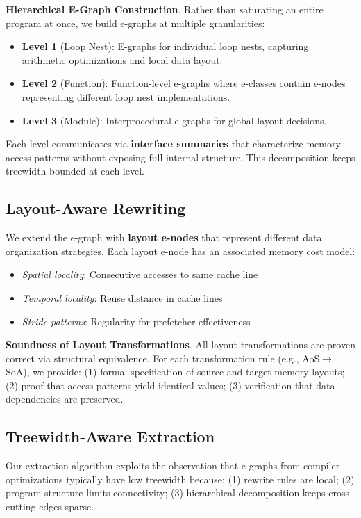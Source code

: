 \documentclass[11pt]{article}
\begin{document}
\textbf{Hierarchical E-Graph Construction}. Rather than saturating an entire program at once, we build e-graphs at multiple granularities:
\begin{itemize}
    \item \textbf{Level 1} (Loop Nest): E-graphs for individual loop nests, capturing arithmetic optimizations and local data layout.
    \item \textbf{Level 2} (Function): Function-level e-graphs where e-classes contain e-nodes representing different loop nest implementations.
    \item \textbf{Level 3} (Module): Interprocedural e-graphs for global layout decisions.
\end{itemize}

Each level communicates via \textbf{interface summaries} that characterize memory access patterns without exposing full internal structure. This decomposition keeps treewidth bounded at each level.

\subsection{Layout-Aware Rewriting}

We extend the e-graph with \textbf{layout e-nodes} that represent different data organization strategies. Each layout e-node has an associated memory cost model:
\begin{itemize}
    \item \textit{Spatial locality}: Consecutive accesses to same cache line
    \item \textit{Temporal locality}: Reuse distance in cache lines
    \item \textit{Stride patterns}: Regularity for prefetcher effectiveness
\end{itemize}

\textbf{Soundness of Layout Transformations}. All layout transformations are proven correct via structural equivalence. For each transformation rule (e.g., AoS$\rightarrow$SoA), we provide: (1) formal specification of source and target memory layouts; (2) proof that access patterns yield identical values; (3) verification that data dependencies are preserved.

\subsection{Treewidth-Aware Extraction}

Our extraction algorithm exploits the observation that e-graphs from compiler optimizations typically have low treewidth because: (1) rewrite rules are local; (2) program structure limits connectivity; (3) hierarchical decomposition keeps cross-cutting edges sparse.
\end{document}
